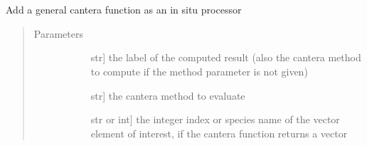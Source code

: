 \documentclass[letterpaper,10pt,english]{sphinxmanual}
\begin{document}
\begin{fulllineitems}

\begin{fulllineitems}
\label{\detokenize{spitfire.chemistry.flamelet:spitfire.chemistry.flamelet.Flamelet.initial_state}}~
\end{fulllineitems}


\begin{fulllineitems}
\label{\detokenize{spitfire.chemistry.flamelet:spitfire.chemistry.flamelet.Flamelet.initial_temperature}}~
\end{fulllineitems}


\begin{fulllineitems}
\label{\detokenize{spitfire.chemistry.flamelet:spitfire.chemistry.flamelet.Flamelet.insitu_process_cantera_method}}
Add a general cantera function as an in situ processor
\begin{quote}\begin{description}
\item[{Parameters}] \leavevmode\begin{description}
\item[{}] \leavevmode{[}str{]}
the label of the computed result (also the cantera method to compute if the method parameter is not given)

\item[{}] \leavevmode{[}str{]}
the cantera method to evaluate

\item[{}] \leavevmode{[}str or int{]}
the integer index or species name of the vector element of interest, if the cantera function returns a vector


\end{description}
\end{description}
\end{quote}
\end{fulllineitems}
\end{fulllineitems}
\end{document}

